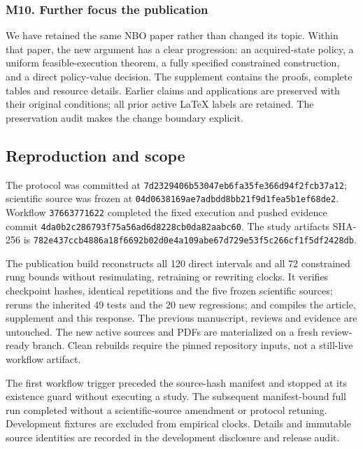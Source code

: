 \documentclass[ecta,nameyear,draft]{econsocart}
\begin{document}
\hypertarget{m10-further-focus-the-publication}{%
\subsubsection{M10. Further focus the
publication}\label{m10-further-focus-the-publication}}

We have retained the same NBO paper rather than changed its topic.
Within that paper, the new argument has a clear progression: an
acquired-state policy, a uniform feasible-execution theorem, a fully
specified constrained construction, and a direct policy-value decision.
The supplement contains the proofs, complete tables and resource
details. Earlier claims and applications are preserved with their
original conditions; all prior active LaTeX labels are retained. The
preservation audit makes the change boundary explicit.

\hypertarget{reproduction-and-scope}{%
\subsection{Reproduction and scope}\label{reproduction-and-scope}}

The protocol was committed at
\nolinkurl{7d2329406b53047eb6fa35fe366d94f2fcb37a12}; scientific source was
frozen at \nolinkurl{04d0638169ae7adbdd8bb21f9d1fea5b1ef68de2}. Workflow
\nolinkurl{37663771622} completed the fixed execution and pushed evidence
commit \nolinkurl{4da0b2c286793f75a56ad6d8228cb0da82aabc60}. The study
artifact\textquotesingle s SHA-256 is
\nolinkurl{782e437ccb4886a18f6692b02d0e4a109abe67d729e53f5c266cf1f5df2428db}.

The publication build reconstructs all 120 direct intervals and all 72
constrained rung bounds without resimulating, retraining or rewriting
clocks. It verifies checkpoint hashes, identical repetitions and the
five frozen scientific sources; reruns the inherited 49 tests and the 20
new regressions; and compiles the article, supplement and this response.
The previous manuscript, reviews and evidence are untouched. The new
active sources and PDFs are materialized on a fresh review-ready branch.
Clean rebuilds require the pinned repository inputs, not a still-live
workflow artifact.

The first workflow trigger preceded the source-hash manifest and stopped
at its existence guard without executing a study. The subsequent
manifest-bound full run completed without a scientific-source amendment
or protocol retuning. Development fixtures are excluded from empirical
clocks. Details and immutable source identities are recorded in the
development disclosure and release audit.
\end{document}

